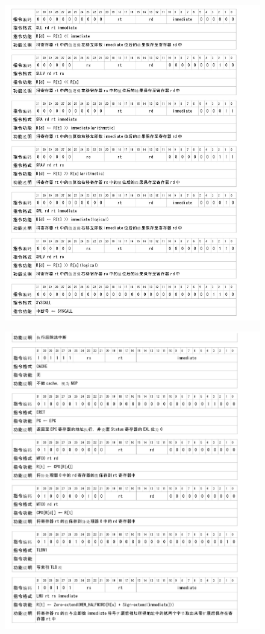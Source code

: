     \begin{figure}[!hbp]
            \centering
            \includegraphics[width=\textwidth]{chart/insert6.jpg}
    \end{figure}

    \begin{figure}[!hbp]
            \centering
            \includegraphics[width=\textwidth]{chart/insert7.jpg}
    \end{figure}
